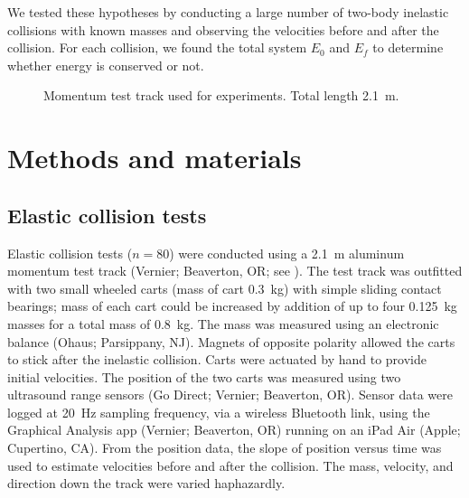 \documentclass[aps,prl,reprint]{revtex4-1}
\begin{document}
We tested these hypotheses by conducting a large number of two-body inelastic collisions with known masses and observing the velocities before and after the collision. For each collision, we found the total system $E_0$ and $E_f$ to determine whether energy is conserved or not. 
\begin{figure}[h]
\begin{center}
\end{center}
\caption{Momentum test track used for experiments. Total length \SI{2.1}{\meter}.}
\label{fig:methods1}
\end{figure}

\section{Methods and materials}
\subsection{Elastic collision tests}
Elastic collision tests ($n=80$) were conducted using a \SI{2.1}{\meter} aluminum momentum test track (Vernier; Beaverton, OR; see ). The test track was outfitted with two small wheeled carts (mass of cart \SI{0.3}{\kilo\gram}) with simple sliding contact bearings; mass of each cart could be increased by addition of up to four \SI{0.125}{\kilo\gram} masses for a total mass of \SI{0.8}{\kilo\gram}. The mass was measured using an electronic balance (Ohaus; Parsippany, NJ).    Magnets of opposite polarity allowed the carts to stick after the inelastic collision. Carts were actuated by hand to provide initial velocities. The position of the two carts was measured using two ultrasound range sensors (Go Direct; Vernier; Beaverton, OR). Sensor data were logged at \SI{20}{\hertz} sampling frequency, via a wireless Bluetooth link, using the Graphical Analysis app (Vernier; Beaverton, OR) running on an iPad Air (Apple; Cupertino, CA). From the position data, the slope of position versus time was used to estimate velocities before and after the collision.  The mass, velocity, and direction down the track were varied haphazardly.   
\end{document}
